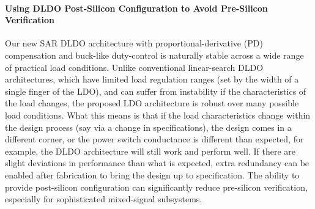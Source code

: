 \paragraph{Using DLDO Post-Silicon Configuration to Avoid Pre-Silicon Verification}
Our new SAR DLDO architecture with proportional-derivative (PD)
compensation and buck-like duty-control is naturally stable across a wide
range of practical load conditions. Unlike conventional linear-search
DLDO architectures, which have limited load regulation ranges (set by the
width of a single finger of the LDO), and can suffer from instability if
the characteristics of the load changes, the proposed LDO architecture is
robust over many possible load conditions. What this means is that if the
load characteristics change within the design process (say via a change
in specifications), the design comes in a different corner, or the power
switch conductance is different than expected, for example, the DLDO
architecture will still work and perform well. If there are slight
deviations in performance than what is expected, extra redundancy can be
enabled after fabrication to bring the design up to specification. The
ability to provide post-silicon configuration can significantly reduce
pre-silicon verification, especially for sophisticated mixed-signal
subsystems.

